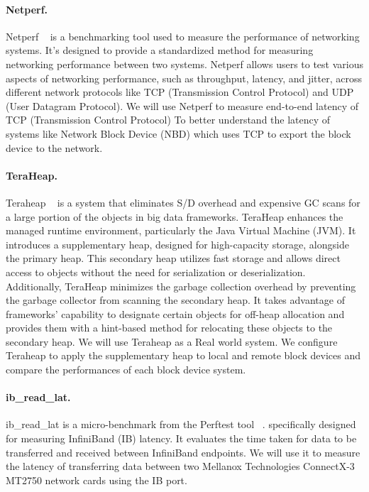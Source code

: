 \paragraph{Netperf.} 
Netperf ~\cite{netperf} is a benchmarking tool used to measure the performance of networking
systems. It's designed to provide a standardized method for measuring networking
performance between two systems. Netperf allows users to test various aspects of
networking performance, such as throughput, latency, and jitter, across
different network protocols like TCP (Transmission Control Protocol) and UDP
(User Datagram Protocol). We will use Netperf to measure end-to-end latency of
TCP (Transmission Control Protocol) To better understand the latency of systems
like Network Block Device (NBD) which uses TCP to export the block device to the
network.

\paragraph{TeraHeap.} Teraheap ~\cite{teraheap} is a system that eliminates S/D overhead and expensive GC scans for a
large portion of the objects in big data frameworks. TeraHeap enhances the
managed runtime environment, particularly the Java Virtual Machine (JVM). It
introduces a supplementary heap, designed for high-capacity storage, alongside
the primary heap. This secondary heap utilizes fast storage and allows direct
access to objects without the need for serialization or deserialization.
Additionally, TeraHeap minimizes the garbage collection overhead by preventing
the garbage collector from scanning the secondary heap. It takes advantage of
frameworks' capability to designate certain objects for off-heap allocation and
provides them with a hint-based method for relocating these objects to the
secondary heap. We will use Teraheap as a Real world system. We configure Teraheap to apply the supplementary heap to local and remote block devices and compare the performances of each block device system.

\paragraph{ib\_read\_lat.} ib\_read\_lat is a micro-benchmark from the Perftest tool ~\cite{perftest}. specifically designed for measuring InfiniBand (IB) latency. It evaluates the time taken for data to be transferred and received between InfiniBand endpoints. We will use it to measure the latency of transferring data between two Mellanox Technologies ConnectX-3 MT2750 network cards using the IB port.

